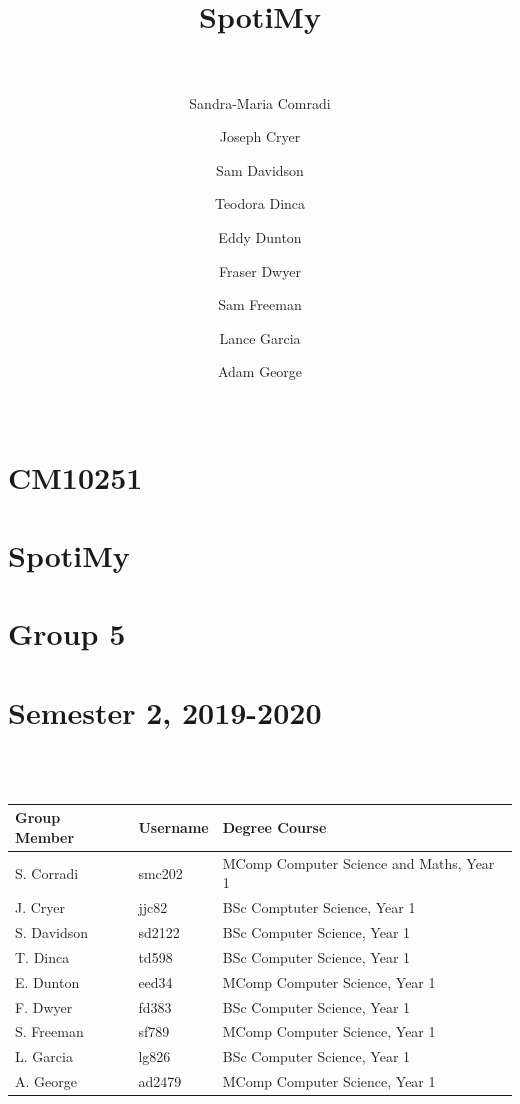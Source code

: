\documentclass[10pt, notitlepage]{report}
\title{\leavevmode \\\leavevmode \\SpotiMy\\\leavevmode \\}
\author{
	Sandra-Maria Comradi
	\and
	Joseph Cryer
	\and
	Sam Davidson
	\and
	Teodora Dinca
	\and
	Eddy Dunton
	\and
	Fraser Dwyer
	\and
	Sam Freeman
	\and
	Lance Garcia
	\and
	Adam George\\\leavevmode \\
}
\begin{document}
\pagebreak
\hspace{0pt}
\vfill

\thispagestyle{empty}
\section*{\centering CM10251}
\section*{\centering SpotiMy}
\section*{\centering Group 5}
\section*{\centering Semester 2,  2019-2020}

\leavevmode \\
\leavevmode \\
\begin{table}[h]
\centering
\begin{tabular}{p{4cm} p{3cm} p{8cm}}
\textbf{Group Member}&\textbf{Username}&\textbf{Degree Course}\\
\hline
S. Corradi&smc202&MComp Computer Science and Maths, Year 1\\
J. Cryer&jjc82&BSc Comptuter Science, Year 1\\
S. Davidson&sd2122&BSc Computer Science, Year 1\\
T. Dinca&td598&BSc Computer Science, Year 1\\
E. Dunton&eed34&MComp Computer Science, Year 1\\
F. Dwyer&fd383&BSc Computer Science, Year 1\\
S. Freeman&sf789&MComp Computer Science, Year 1\\
L. Garcia&lg826&BSc Computer Science, Year 1\\
A. George&ad2479&MComp Computer Science, Year 1\\

\end{tabular}
\end{table}

\vfill
\hspace{0pt}
\pagebreak
\end{document}
